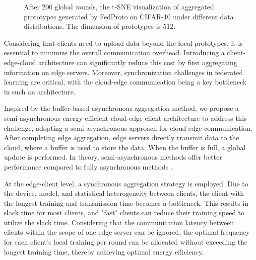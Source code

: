 \documentclass[journal]{IEEEtran}
\begin{document}
\begin{figure}[H]
    \centering
    \hfill

    \caption{After 200 global rounds, the t-SNE visualization of aggregated prototypes generated by FedProto on CIFAR-10 under different data distributions. The dimension of prototypes is 512.}
    \label{motivation_tsne}
\end{figure}
Considering that clients need to upload data beyond the local prototypes, it is essential to minimize the overall communication overhead. Introducing a client-edge-cloud architecture \cite{liu_client-edge-cloud_2020,liu_hierarchical_2023} can significantly reduce this cost by first aggregating information on edge servers. Moreover, synchronization challenges in federated learning are critical, with the cloud-edge communication being a key bottleneck in such an architecture. 

Inspired by the buffer-based asynchronous aggregation method\cite{nguyen_federated_2022}, we propose a semi-asynchronous energy-efficient cloud-edge-client architecture to address this challenge, adopting a semi-asynchronous approach for cloud-edge communication. After completing edge aggregation, edge servers directly transmit data to the cloud, where a buffer is used to store the data. When the buffer is full, a global update is performed. In theory, semi-asynchronous methods offer better performance compared to fully asynchronous methods \cite{nguyen_federated_2022}.

At the edge-client level, a synchronous aggregation strategy is employed. Due to the device, model, and statistical heterogeneity between clients, the client with the longest training and transmission time becomes a bottleneck. This results in slack time for most clients, and "fast" clients can reduce their training speed to utilize the slack time. Considering that the communication latency between clients within the scope of one edge server can be ignored, the optimal frequency for each client's local training per round can be allocated without exceeding the longest training time, thereby achieving optimal energy efficiency. 
\end{document}
